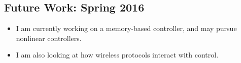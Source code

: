 \documentclass[11pt]{article}
\begin{document}
\subsection*{Future Work: Spring 2016}
\begin{itemize}
\item I am currently working on a memory-based controller, and may pursue nonlinear controllers. %

\item I am also looking at how wireless protocols interact with control.


% 

\end{itemize}
\end{document}
